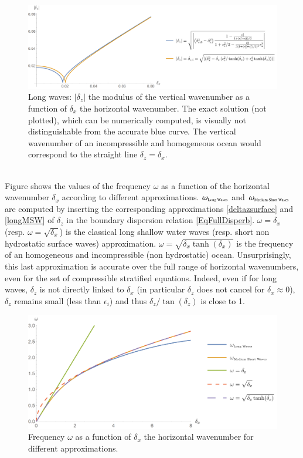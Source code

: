 \begin{figure}[h]
	\centerline{
		\includegraphics[width=0.9\linewidth]{FIGURES/dzdx.png}
	}
	\caption{Long waves: $|\delta_z|$ the modulus of the vertical wavenumber as a function of $\delta_x$ the horizontal wavenumber. The exact solution (not plotted), which can be numerically computed, is visually not distinguishable from the accurate blue curve. The vertical wavenumber of an incompressible and homogeneous ocean would correspond to the straight line $\delta_z=\delta_x$.}
	\label{dzdx}
\end{figure}
\\
%
%
Figure  shows the values of the frequency $\omega$ as a function of the horizontal wavenumber $\delta_x$ according to different approximations. $\omega_{\mbox{\tiny Long Waves}}$ and $\omega_{\mbox{\tiny Medium Short Waves}}$ are computed by inserting the corresponding approximations \ref{deltazsurface} and \ref{longMSW} of $\delta_z$ in the boundary dispersion relation \ref{EqFullDisperb}. $\omega=\delta_x$ (resp. $\omega=\sqrt{\delta_x}$) is the classical long shallow water waves (resp. short non hydrostatic surface waves) approximation. $\omega=\sqrt{\delta_x \tanh(\delta_x)}$ is the frequency of an homogeneous and incompressible (non hydrostatic) ocean. Unsurprisingly, this last approximation is accurate over the full range of horizontal wavenumbers, even for the set of compressible stratified equations. Indeed, even if for long waves, $\delta_z$ is not directly linked to $\delta_x$ (in particular $\delta_z$ does not cancel for $\delta_x \approx 0$), $\delta_z$ remains small (less than $\epsilon_i$) and thus $\delta_z/\tan(\delta_z)$ is close to 1.
\begin{figure}[h]
	\centerline{
		\includegraphics[width=0.9\linewidth]{FIGURES/omegadx.png}
	}
	\caption{Frequency $\omega$ as a function of $\delta_x$ the horizontal wavenumber for different approximations.}
	\label{omegadx}
\end{figure}


